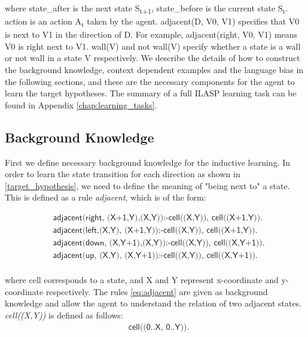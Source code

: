 where \textsf{state\_after} is the next state S\textsubscript{t+1}, \textsf{state\_before} is the current state S\textsubscript{t}. \textsf{action} is an action A\textsubscript{t} taken by the agent.
\textsf{adjacent(D, V0, V1)} specifies that V0 is next to V1 in the direction of D. For example, \textsf{adjacent(right, V0, V1)} means V0 is right next to V1. 
\textsf{wall(V)} and \textsf{not wall(V)} specify whether a state is a wall or not wall in a state V respectively.
We describe the details of how to construct the background knowledge, context dependent examples and the language bias in the following sections, and these are the necessary components for the agent to learn the target hypotheses.
The summary of a full ILASP learning task can be found in Appendix \ref{chap:learning_tasks}.

\subsection{Background Knowledge}
\label{subsec:background_knowledge}
First we define necessary background knowledge for the inductive learning.
In order to learn the state transition for each direction as shown in \ref{target_hypothesis}, we need to define the meaning of "being next to" a state.
This is defined as a rule \textit{adjacent}, which is of the form:

\begin{equation} \label{eq:adjacent}
\begin{split}
&\textsf{adjacent(right, (X+1,Y),(X,Y)):-cell((X,Y)), cell((X+1,Y)).} \\
&\textsf{adjacent(left,(X,Y),  (X+1,Y)):-cell((X,Y)), cell((X+1,Y)).} \\
&\textsf{adjacent(down, (X,Y+1),(X,Y)):-cell((X,Y)), cell((X,Y+1)).} \\
&\textsf{adjacent(up,   (X,Y),  (X,Y+1)):-cell((X,Y)), cell((X,Y+1)).} \\
\end{split}
\end{equation}

where \textsf{cell} corresponds to a state, and \textsf{X} and \textsf{Y} represent x-coordinate and y-coordinate respectively.
The rules \ref{eq:adjacent} are given as background knowledge and allow the agent to understand the relation of two adjacent states.
\textit{cell((X,Y))} is defined as follows:
\begin{equation} \label{eq:cell}
\begin{split}
    &\textsf{cell((0..X, 0..Y)).}
\end{split}
\end{equation}

